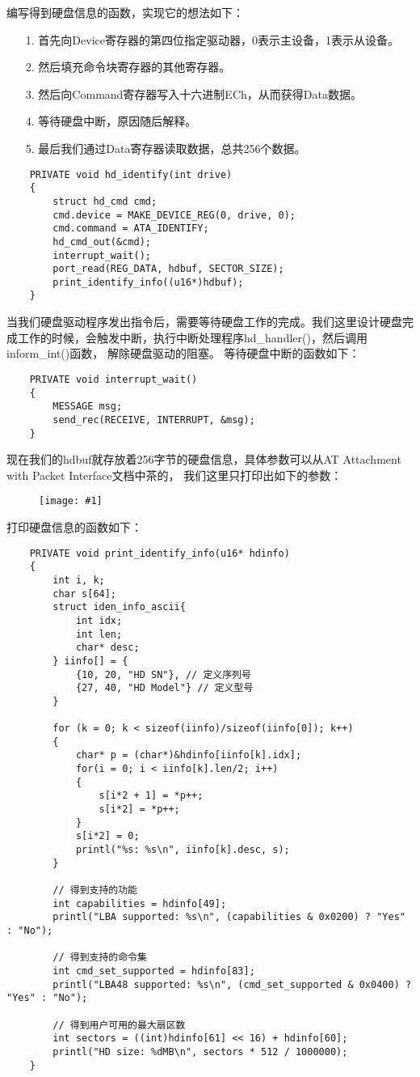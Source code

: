 \documentclass[a4paper,left=2.5cm,right=2.5cm,11pt]{article}
\newcommand{\fic}[1]{\begin{figure}[H]
		\center
		\texttt{[image: \#1]}
	\end{figure}}
\begin{document}
	编写得到硬盘信息的函数，实现它的想法如下：
	\begin{itemize}
		\item[1.] 首先向Device寄存器的第四位指定驱动器，0表示主设备，1表示从设备。
		\item[2.] 然后填充命令块寄存器的其他寄存器。
		\item[3.] 然后向Command寄存器写入十六进制ECh，从而获得Data数据。
		\item[4.] 等待硬盘中断，原因随后解释。
		\item[5.] 最后我们通过Data寄存器读取数据，总共256个数据。
	\end{itemize}

	\begin{lstlisting}
	PRIVATE void hd_identify(int drive)
	{
		struct hd_cmd cmd;
		cmd.device = MAKE_DEVICE_REG(0, drive, 0);
		cmd.command = ATA_IDENTIFY;
		hd_cmd_out(&cmd);
		interrupt_wait();
		port_read(REG_DATA, hdbuf, SECTOR_SIZE);
		print_identify_info((u16*)hdbuf);
	}
	\end{lstlisting}

	当我们硬盘驱动程序发出指令后，需要等待硬盘工作的完成。我们这里设计硬盘完成工作的时候，会触发中断，执行中断处理程序hd\_handler()，然后调用inform\_int()函数，
	解除硬盘驱动的阻塞。
	等待硬盘中断的函数如下：
	\begin{lstlisting}
	PRIVATE void interrupt_wait()
	{
		MESSAGE msg;
		send_rec(RECEIVE, INTERRUPT, &msg);
	}
	\end{lstlisting}

	现在我们的hdbuf就存放着256字节的硬盘信息，具体参数可以从AT Attachment with Packet Interface文档中茶的，
	我们这里只打印出如下的参数：
	\fic{3.png}

	打印硬盘信息的函数如下：
	\begin{lstlisting}
	PRIVATE void print_identify_info(u16* hdinfo)
	{
		int i, k;
		char s[64];
		struct iden_info_ascii{
			int idx;
			int len;
			char* desc;
		} iinfo[] = {
			{10, 20, "HD SN"}, // 定义序列号
			{27, 40, "HD Model"} // 定义型号
		}

		for (k = 0; k < sizeof(iinfo)/sizeof(iinfo[0]); k++)
		{
			char* p = (char*)&hdinfo[iinfo[k].idx];
			for(i = 0; i < iinfo[k].len/2; i++)
			{
				s[i*2 + 1] = *p++;
				s[i*2] = *p++;
			}
			s[i*2] = 0;
			printl("%s: %s\n", iinfo[k].desc, s);
		}

		// 得到支持的功能
		int capabilities = hdinfo[49];
		printl("LBA supported: %s\n", (capabilities & 0x0200) ? "Yes" : "No");

		// 得到支持的命令集
		int cmd_set_supported = hdinfo[83];
		printl("LBA48 supported: %s\n", (cmd_set_supported & 0x0400) ? "Yes" : "No");

		// 得到用户可用的最大扇区数
		int sectors = ((int)hdinfo[61] << 16) + hdinfo[60];
		printl("HD size: %dMB\n", sectors * 512 / 1000000);
	}
	\end{lstlisting}
\end{document}
